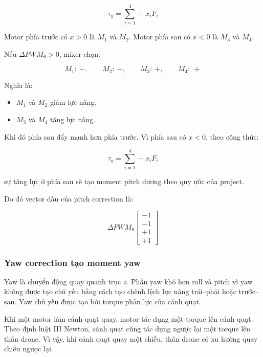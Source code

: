 \begin{equation}
    \tau_y
    =
    \sum_{i=1}^{4} -x_iF_i
\end{equation}

Motor phía trước có $x>0$ là $M_1$ và $M_2$. Motor phía sau có $x<0$ là $M_3$
và $M_4$.

Nếu $\Delta PWM_\theta > 0$, mixer chọn:

\begin{equation}
    M_1:\ -,\qquad
    M_2:\ -,\qquad
    M_3:\ +,\qquad
    M_4:\ +
\end{equation}

Nghĩa là:
\begin{itemize}
    \item $M_1$ và $M_2$ giảm lực nâng.
    \item $M_3$ và $M_4$ tăng lực nâng.
\end{itemize}

Khi đó phía sau đẩy mạnh hơn phía trước. Vì phía sau có $x<0$, theo công thức:

\begin{equation}
    \tau_y = \sum_{i=1}^{4} -x_iF_i
\end{equation}

sự tăng lực ở phía sau sẽ tạo moment pitch dương theo quy ước của project.

Do đó vector dấu của pitch correction là:

\begin{equation}
    \Delta PWM_\theta
    \begin{bmatrix}
        -1\\
        -1\\
        +1\\
        +1
    \end{bmatrix}
\end{equation}

\subsubsection{Yaw correction tạo moment yaw}

Yaw là chuyển động quay quanh trục $z$. Phần yaw khó hơn roll và pitch vì yaw
không được tạo chủ yếu bằng cách tạo chênh lệch lực nâng trái--phải hoặc
trước--sau. Yaw chủ yếu được tạo bởi torque phản lực của cánh quạt.

Khi một motor làm cánh quạt quay, motor tác dụng một torque lên cánh quạt.
Theo định luật III Newton, cánh quạt cũng tác dụng ngược lại một torque lên
thân drone. Vì vậy, khi cánh quạt quay một chiều, thân drone có xu hướng quay chiều ngược lại. 

